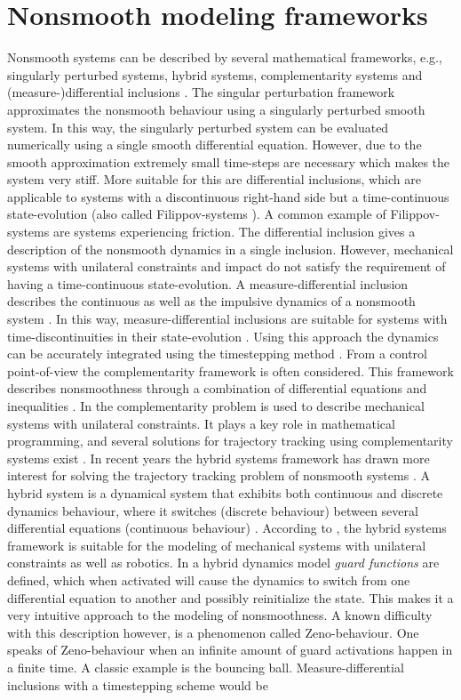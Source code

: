 \documentclass[../DC2017114Bouma.tex]{subfiles}
\begin{document}
\section{Nonsmooth modeling frameworks}
Nonsmooth systems can be described by several mathematical frameworks, e.g., singularly perturbed systems, hybrid systems, complementarity systems and (measure-)differential inclusions \cite{Leine2004}. The singular perturbation framework approximates the nonsmooth behaviour using a singularly perturbed smooth system. In this way, the singularly perturbed system can be evaluated numerically using a single smooth differential equation. However, due to the smooth approximation extremely small time-steps are necessary which makes the system very stiff. More suitable for this are differential inclusions, which are applicable to systems with a discontinuous right-hand side but a time-continuous state-evolution (also called Filippov-systems \cite{Filippov1988}). A common example of Filippov-systems are systems experiencing friction. The differential inclusion gives a description of the nonsmooth dynamics in a single inclusion. However, mechanical systems with unilateral constraints and impact do not satisfy the requirement of having a time-continuous state-evolution. A measure-differential inclusion describes the continuous as well as the impulsive dynamics of a nonsmooth system \cite{Leine2008b}. In this way, measure-differential inclusions are suitable for systems with time-discontinuities in their state-evolution \cite{Moreau1988,Brogliato1999}. Using this approach the dynamics can be accurately integrated using the timestepping method \cite{Wouwa}. From a control point-of-view the complementarity framework is often considered. This framework describes nonsmoothness through a combination of differential equations and inequalities \cite{VanDerSchaft1998,Heemels1999}. In \cite{Glocker2001} the complementarity problem is used to describe mechanical systems with unilateral constraints. It plays a key role in mathematical programming, and several solutions for trajectory tracking using complementarity systems exist \cite{Bourgeot2005,Morarescu2010}. In recent years the hybrid systems framework has drawn more interest for solving the trajectory tracking problem of nonsmooth systems \cite{Hyun2014,Morris2009}. A hybrid system is a dynamical system that exhibits both continuous and discrete dynamics behaviour, where it switches (discrete behaviour) between several differential equations (continuous behaviour) \cite{Goebel2009}. According to \cite{Ding2011a}, the hybrid systems framework is suitable for the modeling of mechanical systems with unilateral constraints as well as robotics. In a hybrid dynamics model \textit{guard functions} are defined, which when activated will cause the dynamics to switch from one differential equation to another and possibly reinitialize the state. This makes it a very intuitive approach to the modeling of nonsmoothness. A known difficulty with this description however, is a phenomenon called Zeno-behaviour. One speaks of Zeno-behaviour when an infinite amount of guard activations happen in a finite time. A classic example is the bouncing ball. Measure-differential inclusions with a timestepping scheme would be 
\end{document}

